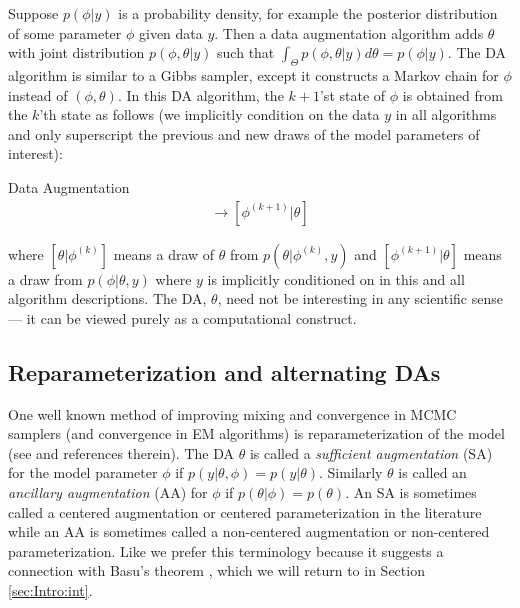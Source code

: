 \documentclass[12pt]{article}
\begin{document}
Suppose $p(\phi|y)$ is a probability density, for example the posterior distribution of some parameter $\phi$ given data $y$. %
Then a data augmentation algorithm adds $\theta$ with joint distribution $p(\phi,\theta|y)$ such that $\int_{\Theta}p(\phi,\theta|y)d\theta = p(\phi|y)$. The DA algorithm is similar to a Gibbs sampler, except it constructs a Markov chain for $\phi$ instead of $(\phi, \theta)$. In this DA algorithm, the $k+1$'st state of $\phi$ is obtained from the $k$'th state as follows (we implicitly condition on the data $y$ in all algorithms and only superscript the previous and new draws of the model parameters of interest):
\begin{alg*}[DA]Data Augmentation\label{alg:DA}
  \begin{align*}
  [\theta|\phi^{(k)}] \to [\phi^{(k+1)}|\theta]
\end{align*}
\end{alg*}
\noindent where $[\theta|\phi^{(k)}]$ means a draw of $\theta$ from $p(\theta|\phi^{(k)},y)$ and $[\phi^{(k+1)}|\theta]$ means a draw from $p(\phi|\theta,y)$ where $y$ is implicitly conditioned on in this and all algorithm descriptions. The DA, $\theta$, need not be interesting in any scientific sense --- it can be viewed purely as a computational construct. 

\subsection{Reparameterization and alternating DAs}

One well known method of improving mixing and convergence in MCMC samplers (and convergence in EM algorithms) is reparameterization of the model (see  \citet{papaspiliopoulos2007general} and references therein). The DA $\theta$ is called a {\it sufficient augmentation} (SA) for the model parameter $\phi$ if $p(y|\theta,\phi)=p(y|\theta)$. Similarly $\theta$ is called an {\it ancillary augmentation} (AA) for $\phi$ if $p(\theta|\phi)=p(\theta)$. An SA is sometimes called a centered augmentation or centered parameterization in the literature while an AA is sometimes called a non-centered augmentation or non-centered parameterization. Like \citet{yu2011center} we prefer this terminology because it suggests a connection with Basu's theorem \citep{basu1955statistics}, which we will return to in Section \ref{sec:Intro:int}.
\end{document}
